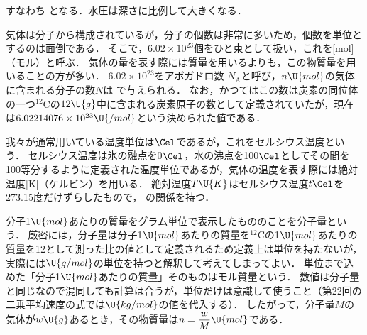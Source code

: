 \noindent すなわち
となる．水圧は深さに比例して大きくなる．\\


気体は分子から構成されているが，分子の個数は非常に多いため，個数を単位とするのは面倒である．
そこで，$6.02\times 10^{23}$個をひと束として扱い，これを{[mol]（モル）}と呼ぶ．
気体の量を表す際には質量を用いるよりも，この物質量を用いることの方が多い．
$6.02\times 10^{23}$を{\gtfamily アボガドロ数} $N_{\mathrm{A}}$と呼び，$n\U{mol}$の気体に含まれる分子の数$N$は
で与えられる．
なお，かつてはこの数は炭素の同位体の一つ$^{12}\mathrm{C}$の$12\U{g}$中に含まれる炭素原子の数として定義されていたが，現在は$6.02214076\times 10^{23}\U{/mol}$という決められた値である．\\


我々が通常用いている温度単位は$\Cel$であるが，これを{\gtfamily セルシウス温度}という．
セルシウス温度は氷の融点を0$\Cel$，水の沸点を100$\Cel$としてその間を100等分するように定義された温度単位であるが，気体の温度を表す際には{\gtfamily 絶対温度[K]（ケルビン）}を用いる．
絶対温度$T\U{K}$はセルシウス温度$t\Cel$を273.15度だけずらしたもので，
の関係を持つ．\\


分子1$\U{mol}$あたりの質量をグラム単位で表示したもののことを{\gtfamily 分子量}という．
厳密には，分子量は分子1$\U{mol}$あたりの質量を$^{12}\mathrm{C}$の1$\U{mol}$あたりの質量を12として測った比の値として定義されるため定義上は単位を持たないが，実際には$\U{g/mol}$の単位を持つと解釈して考えてしまってよい．
単位まで込めた「分子1$\U{mol}$あたりの質量」そのものは{\gtfamily モル質量}という．
数値は分子量と同じなので混同しても計算は合うが，{\gtfamily 単位だけは意識して使うこと}（第22回の二乗平均速度の式では$\U{kg/mol}$の値を代入する）．
したがって，分子量$M$の気体が$w\U{g}$あるとき，その物質量は$n=\dfrac{w}{M}\U{mol}$である．\\

